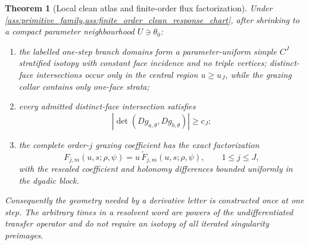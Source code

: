 \documentclass[11pt]{amsart}
\theoremstyle{compactplain}
\newtheorem{theorem}{Theorem}[section]
\theoremstyle{compactdefinition}
\theoremstyle{compactremark}
\begin{document}
\begin{theorem}[Local clean atlas and finite-order flux factorization]
\label{thm:local_clean_atlas_flux_factorization}
Under \cref{ass:primitive_family,ass:finite_order_clean_response_chart}, after
shrinking to a compact parameter neighbourhood \(U\ni\theta_0\):
\begin{enumerate}[label=\textup{(\roman*)},wide,labelindent=0pt]
  \item the labelled one-step branch domains form a parameter-uniform simple
  \(C^J\) stratified isotopy with constant face incidence and no triple
  vertices; distinct-face intersections occur only in the central region
  \(u\ge u_J\), while the grazing collar contains only one-face strata;
  \item every admitted distinct-face intersection satisfies
  \[
    |\det(Dg_{a,\theta},Dg_{b,\theta})|
      \ge c_J;
  \]
  \item the complete order-\(j\) grazing coefficient has the exact
  factorization
  \begin{equation}
  \label{eq:proved_flux_factorization}
    F_{j,m}(u,s;\rho,\psi)
       =u\,\widetilde F_{j,m}(u,s;\rho,\psi),
    \qquad 1\le j\le J,
  \end{equation}
  with the rescaled coefficient and holonomy differences bounded uniformly in
  the dyadic block.
\end{enumerate}
Consequently the geometry needed by a derivative letter is constructed once
at one step.  The arbitrary times in a resolvent word are powers of the
undifferentiated transfer operator and do not require an isotopy of all
iterated singularity preimages.
\end{theorem}
\end{document}

